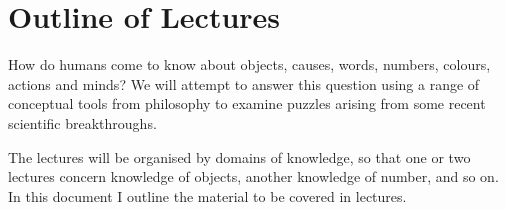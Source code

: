 \documentclass[12pt,\papersize]{extarticle}
\date{}
\begin{document}
\setlength\footnotesep{1em}





\maketitle

\setcounter{secnumdepth}{-1} 


\section{Outline of Lectures}
How do humans come to know about objects, causes, words, numbers, colours, actions and minds?  We will attempt to answer this question using a range of conceptual tools from philosophy to examine puzzles arising from some recent scientific breakthroughs.

The lectures will be organised by domains of knowledge, so that one or two lectures concern knowledge of objects, another knowledge of number, and so on.  
In this document I outline the material to be covered in lectures.
\end{document}
